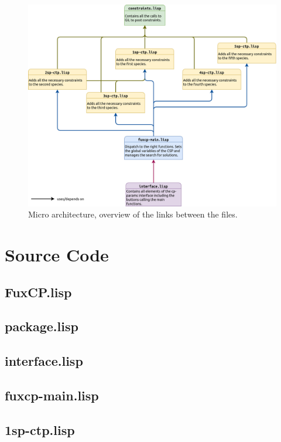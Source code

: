\begin{figure}[h]
  \includegraphics[width=1.2\textwidth, center]{Images/micro_arch.png}
  \caption{Micro architecture, overview of the links between the files.}
  \label{fig:micro_arch}
\end{figure}


\chapter{Source Code}
\section{FuxCP.lisp}

\section{package.lisp}

\section{interface.lisp}

\section{fuxcp-main.lisp}

\section{1sp-ctp.lisp}

